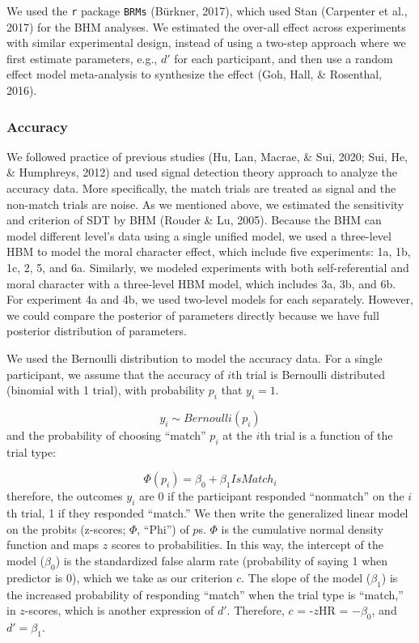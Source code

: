 \documentclass[
  english,
  man]{apa6}
\begin{document}
We used the \texttt{r} package \texttt{BRMs} (Bürkner, 2017), which used Stan (Carpenter et al., 2017) for the BHM analyses. We estimated the over-all effect across experiments with similar experimental design, instead of using a two-step approach where we first estimate parameters, e.g., \(d'\) for each participant, and then use a random effect model meta-analysis to synthesize the effect (Goh, Hall, \& Rosenthal, 2016).

\hypertarget{accuracy}{%
\subsubsection{Accuracy}\label{accuracy}}

We followed practice of previous studies (Hu, Lan, Macrae, \& Sui, 2020; Sui, He, \& Humphreys, 2012) and used signal detection theory approach to analyze the accuracy data. More specifically, the match trials are treated as signal and the non-match trials are noise. As we mentioned above, we estimated the sensitivity and criterion of SDT by BHM (Rouder \& Lu, 2005). Because the BHM can model different level's data using a single unified model, we used a three-level HBM to model the moral character effect, which include five experiments: 1a, 1b, 1c, 2, 5, and 6a. Similarly, we modeled experiments with both self-referential and moral character with a three-level HBM model, which includes 3a, 3b, and 6b. For experiment 4a and 4b, we used two-level models for each separately. However, we could compare the posterior of parameters directly because we have full posterior distribution of parameters.

We used the Bernoulli distribution to model the accuracy data. For a single participant, we assume that the accuracy of \(i\)th trial is Bernoulli distributed (binomial with 1 trial), with probability \(p_{i}\) that \(y_{i} = 1\).

\[ y_{i} \sim Bernoulli(p_{i})\]
and the probability of choosing ``match'' \(p_{i}\) at the \(i\)th trial is a function of the trial type:

\[ \Phi(p_{i}) =  \beta_{0} + \beta_{1}IsMatch_{i}\]
therefore, the outcomes \(y_{i}\) are 0 if the participant responded ``nonmatch'' on the \(i\)th trial, 1 if they responded ``match.'' We then write the generalized linear model on the probits (z-scores; \(\Phi\), ``Phi'') of \(p\)s. \(\Phi\) is the cumulative normal density function and maps \(z\) scores to probabilities. In this way, the intercept of the model (\(\beta_0\)) is the standardized false alarm rate (probability of saying 1 when predictor is 0), which we take as our criterion \(c\). The slope of the model (\(\beta_1\)) is the increased probability of responding ``match'' when the trial type is ``match,'' in \(z\)-scores, which is another expression of \(d'\). Therefore, \(c\) = -\(z\)HR = \(-\beta_0\), and \(d' = \beta_1\).
\end{document}
